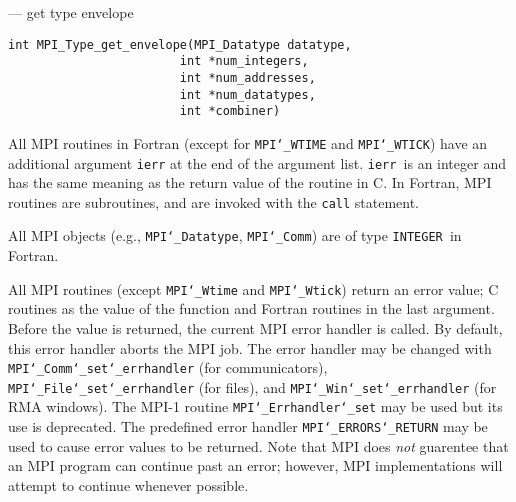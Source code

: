 \startmanpage
{}
--- get type envelope 
\startvb\begin{verbatim}
int MPI_Type_get_envelope(MPI_Datatype datatype,
                        int *num_integers,
                        int *num_addresses,
                        int *num_datatypes,
                        int *combiner)

\end{verbatim}
\endvb

\par
{}
\par
{}
All MPI routines in Fortran (except for {\tt MPI{\tt \char`\_}WTIME} and {\tt MPI{\tt \char`\_}WTICK}) have
an additional argument {\tt ierr} at the end of the argument list.  {\tt ierr
}is an integer and has the same meaning as the return value of the routine
in C.  In Fortran, MPI routines are subroutines, and are invoked with the
{\tt call} statement.
\par
All MPI objects (e.g., {\tt MPI{\tt \char`\_}Datatype}, {\tt MPI{\tt \char`\_}Comm}) are of type {\tt INTEGER
}in Fortran.
\par
{}
\par
All MPI routines (except {\tt MPI{\tt \char`\_}Wtime} and {\tt MPI{\tt \char`\_}Wtick}) return an error value;
C routines as the value of the function and Fortran routines in the last
argument.  Before the value is returned, the current MPI error handler is
called.  By default, this error handler aborts the MPI job.  The error handler
may be changed with {\tt MPI{\tt \char`\_}Comm{\tt \char`\_}set{\tt \char`\_}errhandler} (for communicators),
{\tt MPI{\tt \char`\_}File{\tt \char`\_}set{\tt \char`\_}errhandler} (for files), and {\tt MPI{\tt \char`\_}Win{\tt \char`\_}set{\tt \char`\_}errhandler} (for
RMA windows).  The MPI-1 routine {\tt MPI{\tt \char`\_}Errhandler{\tt \char`\_}set} may be used but
its use is deprecated.  The predefined error handler
{\tt MPI{\tt \char`\_}ERRORS{\tt \char`\_}RETURN} may be used to cause error values to be returned.
Note that MPI does {\em not} guarentee that an MPI program can continue past
an error; however, MPI implementations will attempt to continue whenever
possible.
\par
{}
\endmanpage
